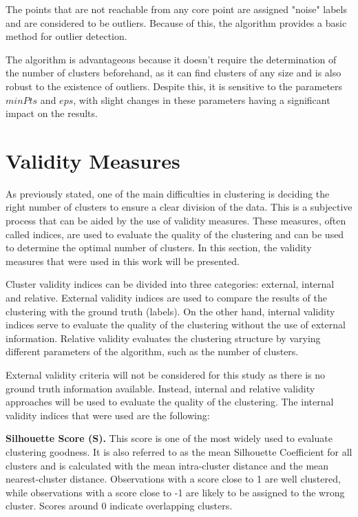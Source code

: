 The points that are not reachable from any core point are assigned "noise" labels and are considered to be outliers. Because of this, the algorithm provides a basic method for outlier detection.

The algorithm is advantageous because it doesn't require the determination of the number of clusters beforehand, as it can find clusters of any size and is also robust to the existence of outliers. Despite this, it is sensitive to the parameters $minPts$ and $eps$, with slight changes in these parameters having a significant impact on the results.

\section{Validity Measures\label{sec:validity_measures}}
As previously stated, one of the main difficulties in clustering is deciding the right number of clusters to ensure a clear division of the data. This is a subjective process that can be aided by the use of validity measures. These measures, often called indices, are used to evaluate the quality of the clustering and can be used to determine the optimal number of clusters. In this section, the validity measures that were used in this work will be presented.

Cluster validity indices can be divided into three categories: external, internal and relative. External validity indices are used to compare the results of the clustering with the ground truth (labels). On the other hand, internal validity indices serve to evaluate the quality of the clustering without the use of external information. Relative validity evaluates the clustering structure by varying different parameters of the algorithm, such as the number of clusters.

External validity criteria will not be considered for this study as there is no ground truth information available. Instead, internal and relative validity approaches will be used to evaluate the quality of the clustering. The internal validity indices that were used are the following:

\noindent\textbf{Silhouette Score (S).} This score is one of the most widely used to evaluate clustering goodness. It is also referred to as the mean Silhouette Coefficient for all clusters and is calculated with the mean intra-cluster distance and the mean nearest-cluster distance. Observations with a score close to 1 are well clustered, while observations with a score close to -1 are likely to be assigned to the wrong cluster. Scores around 0 indicate overlapping clusters.

